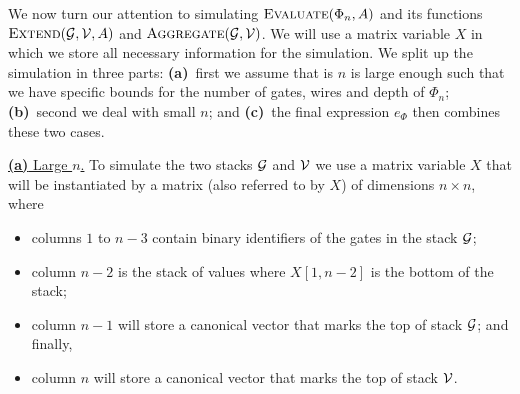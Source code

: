 \medskip
We now turn our attention to simulating $\textsc{Evaluate}(\Phi_n,A)$ and its functions $\textsc{Extend}(\mathcal{G},\mathcal{V},A)$ and $\textsc{Aggregate}(\mathcal{G},\mathcal{V})$. We will use a matrix variable $X$ in which we store all necessary information for the simulation. We split up the simulation in three parts:
\textbf{(a)}~first we assume that is $n$ is large enough such that we have specific bounds for the number of gates, wires
and depth of $\Phi_n$; \textbf{(b)}~second we deal with small $n$; and \textbf{(c)}~the final expression $e_\Phi$ then combines these two cases.

\medskip
\noindent
\underline{\textbf{(a)} Large $n$.}
 To simulate the two stacks $\mathcal{G}$ and $\mathcal{V}$ we use a matrix variable $X$ that will be instantiated by a matrix (also referred to by $X$) of dimensions $n \times n$, where
    \begin{itemize}
        \item columns $1$ to $n-3$ contain binary identifiers of the gates in the stack $\mathcal{G}$;
        \item column $n-2$ is the stack of values where $X[1, n-2]$ is the bottom of the stack;
        \item column $n-1$ will store a canonical vector that marks the top of stack $\mathcal{G}$; and finally,
        \item column $n$ will store a canonical vector that marks the top of stack $\mathcal{V}$.
    \end{itemize}
